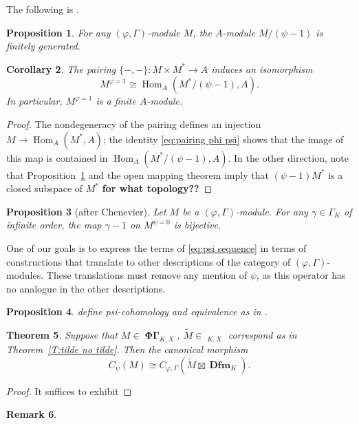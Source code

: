 \documentclass[12pt]{amsart}
\newtheorem{theorem}{Theorem}[section]
\newtheorem{cor}[theorem]{Corollary}
\newtheorem{prop}[theorem]{Proposition}
\theoremstyle{definition}
\newtheorem{remark}[theorem]{Remark}
\numberwithin{equation}{theorem}
\DeclareMathOperator{\Dfm}{\mathbf{Dfm}}
\DeclareMathOperator{\Hom}{Hom}
\DeclareMathOperator{\PhiGamma}{\mathbf{\Phi \Gamma}}
\DeclareMathOperator{\PhiGammatilde}{\widetilde{\mathbf{\Phi \Gamma}}}
\begin{document}
The following is \cite[Proposition~3.3.2(1)]{kpx}.
\begin{prop} \label{P:psi finite}
For any $(\varphi, \Gamma)$-module $M$,
the $A$-module $M/(\psi-1)$ is finitely generated.
\end{prop}
\begin{cor}
The pairing $\{-,-\}: M \times M^* \to A$ induces an isomorphism
\[
M^{\varphi=1} \cong \Hom_A(M^*/(\psi-1), A).
\]
In particular, $M^{\varphi=1}$ is a finite $A$-module.
\end{cor}
\begin{proof}
The nondegeneracy of the pairing defines an injection $M \to \Hom_A(M^*, A)$;
the identity \eqref{eq:pairing phi psi} shows that the image of this map is contained in
$\Hom_A(M^*/(\psi-1), A)$. In the other direction, note that Proposition~\ref{P:psi finite} and the open mapping theorem imply that $(\psi-1)M^*$ is a closed subspace of $M^*$
\textbf{for what topology??}
\end{proof}

\begin{prop}[after Chenevier]
Let $M$ be a $(\varphi, \Gamma)$-module.
For any $\gamma \in \Gamma_K$ of infinite order, the map $\gamma-1$ on $M^{\psi=0}$ is bijective.
\end{prop}

One of our goals is to express the terms of \eqref{eq:psi sequence} in terms of constructions that translate to other descriptions of the category of $(\varphi, \Gamma)$-modules. These translations must remove any mention of $\psi$, as this operator has no analogue in the other descriptions.

\begin{prop}
define psi-cohomology and equivalence as in \cite[Definition~2.3.3]{kpx}.
\end{prop}

\begin{theorem}
Suppose that $M \in \PhiGamma_{K,X}$, $\tilde{M} \in \PhiGammatilde_{K,X}$ correspond as in 
Theorem~\ref{T:tilde no tilde}. Then the canonical morphism
\[
C_{\psi}(M) \cong C_{\varphi,\Gamma}(\tilde{M} \boxtimes \Dfm_{K}).
\]
\end{theorem}
\begin{proof}
It suffices to exhibit 
\end{proof}

\begin{remark}
\end{remark}
\end{document}
